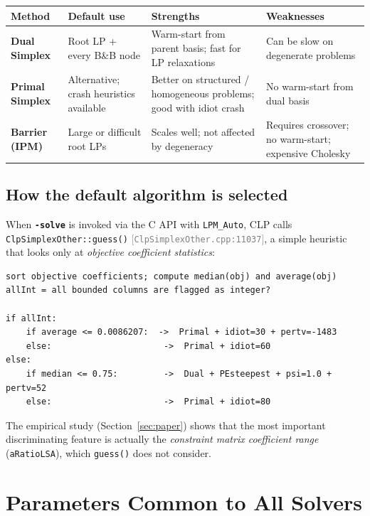 \documentclass[11pt,a4paper]{article}
\newcommand{\param}[1]{\texttt{\textbf{#1}}}
\newcommand{\val}[1]{\texttt{#1}}
\newcommand{\src}[1]{\textcolor{gray}{\small[\texttt{#1}]}}
\begin{document}
\begin{center}
\begin{tabular}{@{}P{3cm}P{4cm}P{4.5cm}P{3cm}@{}}
  \toprule
  \textbf{Method} & \textbf{Default use} & \textbf{Strengths} & \textbf{Weaknesses} \\
  \midrule
  \textbf{Dual Simplex} & Root LP + every B\&B node & Warm-start from parent basis; fast for LP relaxations & Can be slow on degenerate problems \\
  \addlinespace
  \textbf{Primal Simplex} & Alternative; crash heuristics available & Better on structured / homogeneous problems; good with idiot crash & No warm-start from dual basis \\
  \addlinespace
  \textbf{Barrier (IPM)} & Large or difficult root LPs & Scales well; not affected by degeneracy & Requires crossover; no warm-start; expensive Cholesky \\
  \bottomrule
\end{tabular}
\end{center}

\subsection{How the default algorithm is selected}

When \param{-solve} is invoked via the C API with \val{LPM\_Auto}, CLP calls
\texttt{ClpSimplexOther::guess()} \src{ClpSimplexOther.cpp:11037}, a simple heuristic
that looks only at \textit{objective coefficient statistics}:

\begin{lstlisting}
sort objective coefficients; compute median(obj) and average(obj)
allInt = all bounded columns are flagged as integer?

if allInt:
    if average <= 0.0086207:  ->  Primal + idiot=30 + pertv=-1483
    else:                      ->  Primal + idiot=60
else:
    if median <= 0.75:         ->  Dual + PEsteepest + psi=1.0 + pertv=52
    else:                      ->  Primal + idiot=80
\end{lstlisting}

The empirical study (Section~\ref{sec:paper}) shows that the most important
discriminating feature is actually the \emph{constraint matrix coefficient range}
(\texttt{aRatioLSA}), which \texttt{guess()} does not consider.

\section{Parameters Common to All Solvers}
\label{sec:common}
\end{document}
